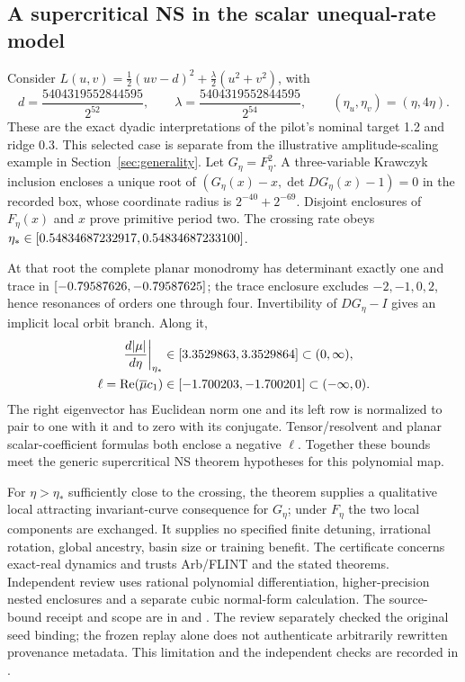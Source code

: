 \documentclass[11pt,letterpaper]{article}
\begin{document}
\subsection{A supercritical NS in the scalar unequal-rate model}
\label{sec:scalar-proof}

Consider $L(u,v)=\tfrac12(uv-d)^2+\tfrac\lambda2(u^2+v^2)$, with
\begin{equation}
d=\frac{5404319552844595}{2^{52}},\qquad
\lambda=\frac{5404319552844595}{2^{54}},\qquad
(\eta_u,\eta_v)=(\eta,4\eta).
\end{equation}
These are the exact dyadic interpretations of the pilot's nominal target 1.2 and ridge 0.3.
This selected case is separate from the illustrative amplitude-scaling example in Section~\ref{sec:generality}.
Let $G_\eta=F_\eta^2$. A three-variable Krawczyk inclusion encloses a unique root of
$(G_\eta(x)-x,\det DG_\eta(x)-1)=0$ in the recorded box, whose coordinate radius is
$2^{-40}+2^{-69}$. Disjoint enclosures of $F_\eta(x)$ and $x$ prove primitive period two.
The crossing rate obeys $\eta_*\in[0.54834687232917, 0.54834687233100]$.

At that root the complete planar monodromy has determinant exactly one and trace in
$[-0.79587626, -0.79587625]$; the trace enclosure excludes $-2,-1,0,2$, hence resonances of orders one through four.
Invertibility of $DG_\eta-I$ gives an implicit local orbit branch. Along it,
\begin{equation}
\begin{aligned}
\frac{d|\mu|}{d\eta}\bigg|_{\eta_*}&\in[3.3529863, 3.3529864]\subset(0,\infty),\\
\ell=\operatorname{Re}(\overline\mu c_1)&\in[-1.700203, -1.700201]\subset(-\infty,0).
\end{aligned}
\end{equation}
The right eigenvector has Euclidean norm one and its left row is normalized to pair to one with it
and to zero with its conjugate. Tensor/resolvent and planar scalar-coefficient formulas both enclose a
negative $\ell$. Together these bounds meet the generic supercritical NS theorem hypotheses
\citep{kuznetsovsacker2008} for this polynomial map.

For $\eta>\eta_*$ sufficiently close to the crossing, the theorem supplies a qualitative local attracting
invariant-curve consequence for $G_\eta$; under $F_\eta$ the two local components are exchanged.
It supplies no specified finite detuning, irrational rotation, global ancestry, basin size or training benefit.
The certificate concerns exact-real dynamics and trusts Arb/FLINT and the stated theorems.
Independent review uses rational polynomial differentiation, higher-precision nested enclosures and a separate
cubic normal-form calculation. The source-bound receipt and scope are in
 and .
The review separately checked the original seed binding; the frozen replay alone does not authenticate
arbitrarily rewritten provenance metadata. This limitation and the independent checks are recorded in
.
\end{document}
